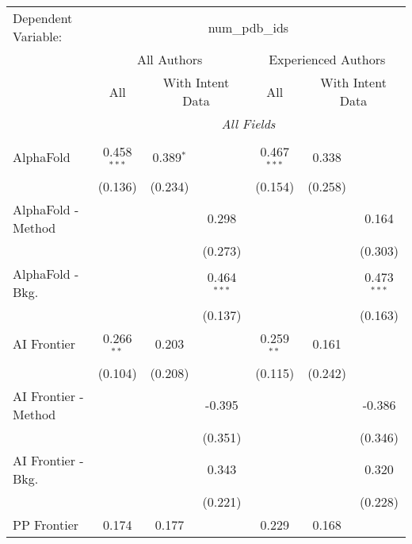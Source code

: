 \begingroup
\centering
\begin{tabular}{lcccccc}
   \tabularnewline \midrule \midrule
   Dependent Variable: & \multicolumn{6}{c}{num\_pdb\_ids}\\
 & \multicolumn{3}{c}{All Authors} & \multicolumn{3}{c}{Experienced Authors} \\
\cmidrule(lr){2-4} \cmidrule(lr){5-7}
 & \multicolumn{1}{c}{All} & \multicolumn{2}{c}{With Intent Data} & \multicolumn{1}{c}{All} & \multicolumn{2}{c}{With Intent Data} \\
\cmidrule(lr){2-2} \cmidrule(lr){3-4} \cmidrule(lr){5-5} \cmidrule(lr){6-7}
 & \multicolumn{6}{c}{\textit{All Fields}} \\ \\
   AlphaFold            & 0.458$^{***}$ & 0.389$^{*}$ &               & 0.467$^{***}$ & 0.338   &   \\   
                        & (0.136)       & (0.234)     &               & (0.154)       & (0.258) &   \\   
   AlphaFold - Method   &               &             & 0.298         &               &         & 0.164\\   
                        &               &             & (0.273)       &               &         & (0.303)\\   
   AlphaFold - Bkg.     &               &             & 0.464$^{***}$ &               &         & 0.473$^{***}$\\   
                        &               &             & (0.137)       &               &         & (0.163)\\   
   AI Frontier          & 0.266$^{**}$  & 0.203       &               & 0.259$^{**}$  & 0.161   &   \\   
                        & (0.104)       & (0.208)     &               & (0.115)       & (0.242) &   \\   
   AI Frontier - Method &               &             & -0.395        &               &         & -0.386\\   
                        &               &             & (0.351)       &               &         & (0.346)\\   
   AI Frontier - Bkg.   &               &             & 0.343         &               &         & 0.320\\   
                        &               &             & (0.221)       &               &         & (0.228)\\   
   PP Frontier          & 0.174         & 0.177       &               & 0.229         & 0.168   &   \\   

\end{tabular}
